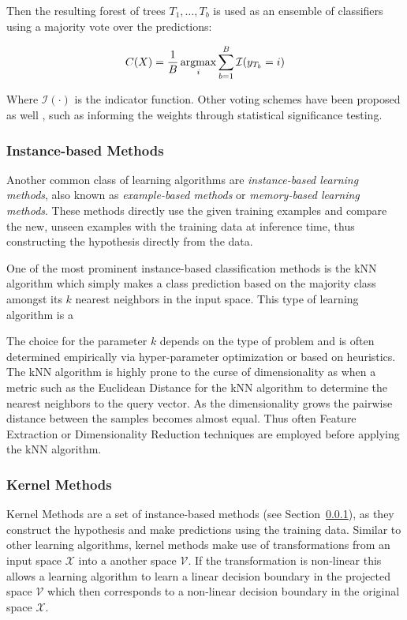 Then the resulting forest of trees ${T_1, \ldots, T_b}$ is used as an ensemble of classifiers using a majority vote over the predictions:

\begin{equation}
  C(X) = \frac{1}{B} \argmax_i \sum_{b = 1}^B \mathcal{I}(y_{T_b} = i)
\end{equation}

Where $\mathcal{I}(\cdot)$ is the indicator function. Other voting schemes have been proposed as well , such as informing the weights through statistical significance testing.

\subsubsection{Instance-based Methods}
\label{subs:Instance-based Methods}

Another common class of learning algorithms are \emph{instance-based learning methods}, also known as \emph{example-based methods} or \emph{memory-based learning methods}. These methods directly use the given training examples and compare the new, unseen examples with the training data at inference time, thus constructing the hypothesis directly from the data.

One of the most prominent instance-based classification methods is the \gls{kNN} algorithm which simply makes a class prediction based on the majority class amongst its $k$ nearest neighbors in the input space. This type of learning algorithm is a

The choice for the parameter $k$ depends on the type of problem and is often determined empirically via hyper-parameter optimization or based on heuristics. The \gls{kNN} algorithm is highly prone to the curse of dimensionality as when a metric such as the Euclidean Distance for the \gls{kNN} algorithm to determine the nearest neighbors to the query vector. As the dimensionality grows the pairwise distance between the samples becomes almost equal. Thus often \gls{Feature Extraction} or \gls{Dimensionality Reduction} techniques are employed before applying the \gls{kNN} algorithm.

\subsubsection{Kernel Methods}
\label{subs:Kernel Methods}

Kernel Methods are a set of instance-based methods (see Section~\ref{subs:Instance-based Methods}), as they construct the hypothesis and make predictions using the training data. Similar to other learning algorithms, kernel methods make use of transformations from an input space $\mathcal{X}$ into a another space $\mathcal{V}$. If the transformation is non-linear this allows a learning algorithm to learn a linear decision boundary in the projected space $\mathcal{V}$ which then corresponds to a non-linear decision boundary in the original space $\mathcal{X}$.

